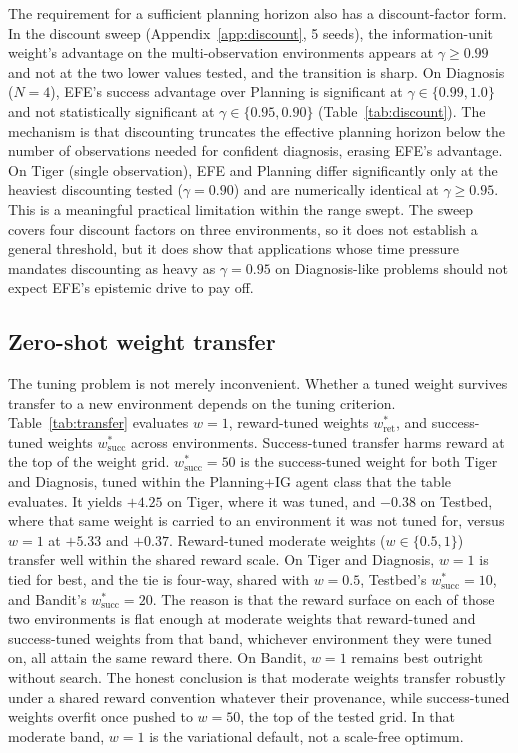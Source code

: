 The requirement for a sufficient planning horizon also has a discount-factor form. In the discount sweep (Appendix~\ref{app:discount}, 5 seeds), the information-unit weight's advantage on the multi-observation environments appears at $\gamma \geq 0.99$ and not at the two lower values tested, and the transition is sharp. On Diagnosis ($N{=}4$), EFE's success advantage over Planning is significant at $\gamma \in \{0.99, 1.0\}$ and not statistically significant at $\gamma \in \{0.95, 0.90\}$ (Table~\ref{tab:discount}). The mechanism is that discounting truncates the effective planning horizon below the number of observations needed for confident diagnosis, erasing EFE's advantage. On Tiger (single observation), EFE and Planning differ significantly only at the heaviest discounting tested ($\gamma{=}0.90$) and are numerically identical at $\gamma \geq 0.95$. This is a meaningful practical limitation within the range swept. The sweep covers four discount factors on three environments, so it does not establish a general threshold, but it does show that applications whose time pressure mandates discounting as heavy as $\gamma{=}0.95$ on Diagnosis-like problems should not expect EFE's epistemic drive to pay off.

\subsection{Zero-shot weight transfer}
The tuning problem is not merely inconvenient. Whether a tuned weight survives transfer to a new environment depends on the tuning criterion. Table~\ref{tab:transfer} evaluates $w{=}1$, reward-tuned weights $w^*_{\mathrm{ret}}$, and success-tuned weights $w^*_{\mathrm{succ}}$ across environments. Success-tuned transfer harms reward at the top of the weight grid. $w^*_{\mathrm{succ}}{=}50$ is the success-tuned weight for both Tiger and Diagnosis, tuned within the Planning+IG agent class that the table evaluates. It yields $+4.25$ on Tiger, where it was tuned, and $-0.38$ on Testbed, where that same weight is carried to an environment it was not tuned for, versus $w{=}1$ at $+5.33$ and $+0.37$. Reward-tuned moderate weights ($w\in\{0.5,1\}$) transfer well within the shared reward scale. On Tiger and Diagnosis, $w{=}1$ is tied for best, and the tie is four-way, shared with $w{=}0.5$, Testbed's $w^*_{\mathrm{succ}}{=}10$, and Bandit's $w^*_{\mathrm{succ}}{=}20$. The reason is that the reward surface on each of those two environments is flat enough at moderate weights that reward-tuned and success-tuned weights from that band, whichever environment they were tuned on, all attain the same reward there. On Bandit, $w{=}1$ remains best outright without search. The honest conclusion is that moderate weights transfer robustly under a shared reward convention whatever their provenance, while success-tuned weights overfit once pushed to $w{=}50$, the top of the tested grid. In that moderate band, $w{=}1$ is the variational default, not a scale-free optimum.

